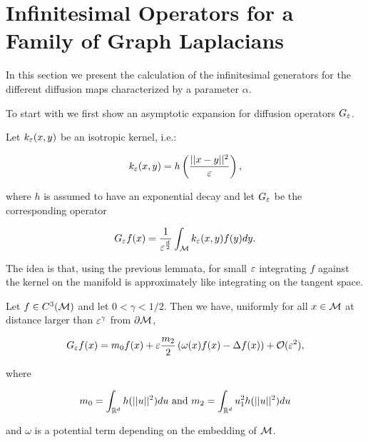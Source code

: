 \section{Infinitesimal Operators for a Family of Graph Laplacians}
In this section we present the calculation of the infinitesimal generators for the different diffusion maps characterized by a parameter $\alpha$.

To start with we first show an asymptotic expansion for diffusion operators $G_\varepsilon$.

Let $k_\varepsilon(x,y)$ be an isotropic kernel, i.e.:

\begin{equation*}
k_\varepsilon(x,y)=h\left(\frac{||x-y||^2}{\varepsilon} \right),
\end{equation*}

where $h$ is assumed to have an exponential decay and let $G_\varepsilon$ be the corresponding operator

\begin{equation*}
G_\varepsilon f(x)=\frac{1}{\varepsilon^\frac{d}{2}}\int_{\mathcal{M}} k_\varepsilon(x,y)f(y)dy.
\end{equation*}

The idea is that, using the previous lemmata, for small $\varepsilon$ integrating $f$ against the kernel on the manifold is approximately like integrating on the tangent space.

\begin{theorem}\label{thm:diffOpExpansion}
Let $f\in C^3(\mathcal{M})$ and let $0 <\gamma<1/2$. Then we have, uniformly for all $x\in\mathcal{M}$ at distance larger than $\varepsilon^\gamma$ from $\partial\mathcal{M}$,

\begin{equation*}
G_\varepsilon f(x)=m_0 f(x)+\varepsilon\frac{m_2}{2}\left(\omega(x)f(x)-\Delta f(x) \right)+\mathcal{O}(\varepsilon^2),
\end{equation*}

where

\begin{equation*}
m_0=\int_{\mathbb{R}^d} h(||u||^2)du \text{ and } m_2=\int_{\mathbb{R}^d} u_1^2 h(||u||^2)du
\end{equation*}

and $\omega$ is a potential term depending on the embedding of $\mathcal{M}$.
\end{theorem}

